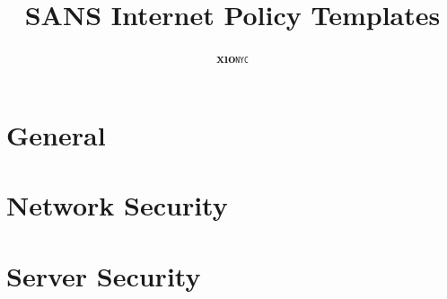 \documentclass[letterpaper,12pt]{report}
\begin{document}
\newcommand{\xio}{\textsf{\textbf{x\i{}o}\texttt{\textsc{nyc}}}}
\author{\xio}
\title{SANS Internet Policy Templates}
\date{}

\maketitle
\tableofcontents
\part{General}
\part{Network Security}
\part{Server Security}
\end{document}
